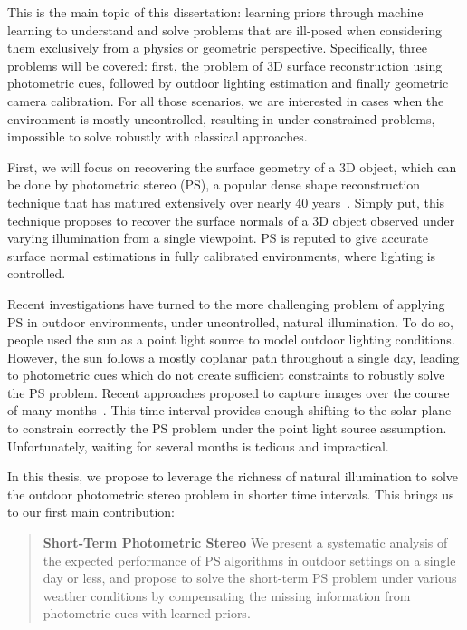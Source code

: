 This is the main topic of this dissertation: learning priors through machine learning to understand and solve problems that are ill-posed when considering them exclusively from a physics or geometric perspective. Specifically, three problems will be covered: first, the problem of 3D surface reconstruction using photometric cues, followed by outdoor lighting estimation and finally geometric camera calibration. For all those scenarios, we are interested in cases when the environment is mostly uncontrolled, resulting in under-constrained problems, impossible to solve robustly with classical approaches. 

First, we will focus on recovering the surface geometry of a 3D object, which can be done by photometric stereo (PS), a popular dense shape reconstruction technique that has matured extensively over nearly 40 years~\cite{woodham-opteng-80}. %
Simply put, this technique proposes to recover the surface normals of a 3D object observed under varying illumination from a single viewpoint. 
PS is reputed to give accurate surface normal estimations in fully calibrated environments, where lighting is controlled. 

Recent investigations have turned to the more challenging problem of applying PS in outdoor environments, under uncontrolled, natural illumination. To do so, people used the sun as a point light source to model outdoor lighting conditions. However, the sun follows a mostly coplanar path throughout a single day, leading to photometric cues which do not create sufficient constraints to robustly solve the PS problem. Recent approaches proposed to capture images over the course of many months~\cite{ackermann-cvpr-12,abrams-eccv-12}. This time interval provides enough shifting to the solar plane to constrain correctly the PS problem under the point light source assumption. Unfortunately, waiting for several months is tedious and impractical. 

In this thesis, we propose to leverage the richness of natural illumination to solve the outdoor photometric stereo problem in shorter time intervals. This brings us to our first main contribution: 

\begin{quotation}
\textbf{Short-Term Photometric Stereo} We present a systematic analysis of the expected performance of PS algorithms in outdoor settings on a single day or less, and propose to solve the short-term PS problem under various weather conditions by compensating the missing information from photometric cues with learned priors. 
\end{quotation}

